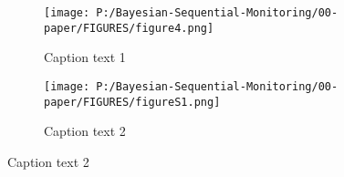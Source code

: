 \documentclass[12pt]{article}
\begin{document}
\begin{figure}
  \begin{subfigure}{7in}
    \centering\texttt{[image: P:/Bayesian-Sequential-Monitoring/00-paper/FIGURES/figure4.png]}
    \caption{Caption text 1}
  \end{subfigure}
  \begin{subfigure}{7in}
    \centering\texttt{[image: P:/Bayesian-Sequential-Monitoring/00-paper/FIGURES/figureS1.png]}
    \caption{Caption text 2}
  \end{subfigure}
 
\end{figure}
\end{document}
